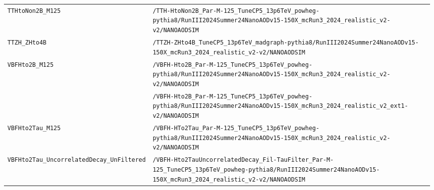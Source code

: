 \begin{longtable}{@{}>{\RaggedRight\arraybackslash}p{} >{\RaggedRight\arraybackslash}p{}@{}}
\addlinespace[2pt]
\texttt{TTHtoNon2B\_\allowbreak{}M125} & \texttt{/\allowbreak{}TTH-\allowbreak{}HtoNon2B\_\allowbreak{}Par-\allowbreak{}M-\allowbreak{}125\_\allowbreak{}TuneCP5\_\allowbreak{}13p6TeV\_\allowbreak{}powheg-\allowbreak{}pythia8/\allowbreak{}RunIII2024Summer24NanoAODv15-\allowbreak{}150X\_\allowbreak{}mcRun3\_\allowbreak{}2024\_\allowbreak{}realistic\_\allowbreak{}v2-\allowbreak{}v2/\allowbreak{}NANOAODSIM} \\
\addlinespace[2pt]
\texttt{TTZH\_\allowbreak{}ZHto4B} & \texttt{/\allowbreak{}TTZH-\allowbreak{}ZHto4B\_\allowbreak{}TuneCP5\_\allowbreak{}13p6TeV\_\allowbreak{}madgraph-\allowbreak{}pythia8/\allowbreak{}RunIII2024Summer24NanoAODv15-\allowbreak{}150X\_\allowbreak{}mcRun3\_\allowbreak{}2024\_\allowbreak{}realistic\_\allowbreak{}v2-\allowbreak{}v2/\allowbreak{}NANOAODSIM} \\
\addlinespace[2pt]
\texttt{VBFHto2B\_\allowbreak{}M125} & \texttt{/\allowbreak{}VBFH-\allowbreak{}Hto2B\_\allowbreak{}Par-\allowbreak{}M-\allowbreak{}125\_\allowbreak{}TuneCP5\_\allowbreak{}13p6TeV\_\allowbreak{}powheg-\allowbreak{}pythia8/\allowbreak{}RunIII2024Summer24NanoAODv15-\allowbreak{}150X\_\allowbreak{}mcRun3\_\allowbreak{}2024\_\allowbreak{}realistic\_\allowbreak{}v2-\allowbreak{}v2/\allowbreak{}NANOAODSIM} \\
 & \texttt{/\allowbreak{}VBFH-\allowbreak{}Hto2B\_\allowbreak{}Par-\allowbreak{}M-\allowbreak{}125\_\allowbreak{}TuneCP5\_\allowbreak{}13p6TeV\_\allowbreak{}powheg-\allowbreak{}pythia8/\allowbreak{}RunIII2024Summer24NanoAODv15-\allowbreak{}150X\_\allowbreak{}mcRun3\_\allowbreak{}2024\_\allowbreak{}realistic\_\allowbreak{}v2\_\allowbreak{}ext1-\allowbreak{}v2/\allowbreak{}NANOAODSIM} \\
\addlinespace[2pt]
\texttt{VBFHto2Tau\_\allowbreak{}M125} & \texttt{/\allowbreak{}VBFH-\allowbreak{}HTo2Tau\_\allowbreak{}Par-\allowbreak{}M-\allowbreak{}125\_\allowbreak{}TuneCP5\_\allowbreak{}13p6TeV\_\allowbreak{}powheg-\allowbreak{}pythia8/\allowbreak{}RunIII2024Summer24NanoAODv15-\allowbreak{}150X\_\allowbreak{}mcRun3\_\allowbreak{}2024\_\allowbreak{}realistic\_\allowbreak{}v2-\allowbreak{}v2/\allowbreak{}NANOAODSIM} \\
\addlinespace[2pt]
\texttt{VBFHto2Tau\_\allowbreak{}UncorrelatedDecay\_\allowbreak{}UnFiltered} & \texttt{/\allowbreak{}VBFH-\allowbreak{}Hto2TauUncorrelatedDecay\_\allowbreak{}Fil-\allowbreak{}TauFilter\_\allowbreak{}Par-\allowbreak{}M-\allowbreak{}125\_\allowbreak{}TuneCP5\_\allowbreak{}13p6TeV\_\allowbreak{}powheg-\allowbreak{}pythia8/\allowbreak{}RunIII2024Summer24NanoAODv15-\allowbreak{}150X\_\allowbreak{}mcRun3\_\allowbreak{}2024\_\allowbreak{}realistic\_\allowbreak{}v2-\allowbreak{}v2/\allowbreak{}NANOAODSIM} \\

\end{longtable}
